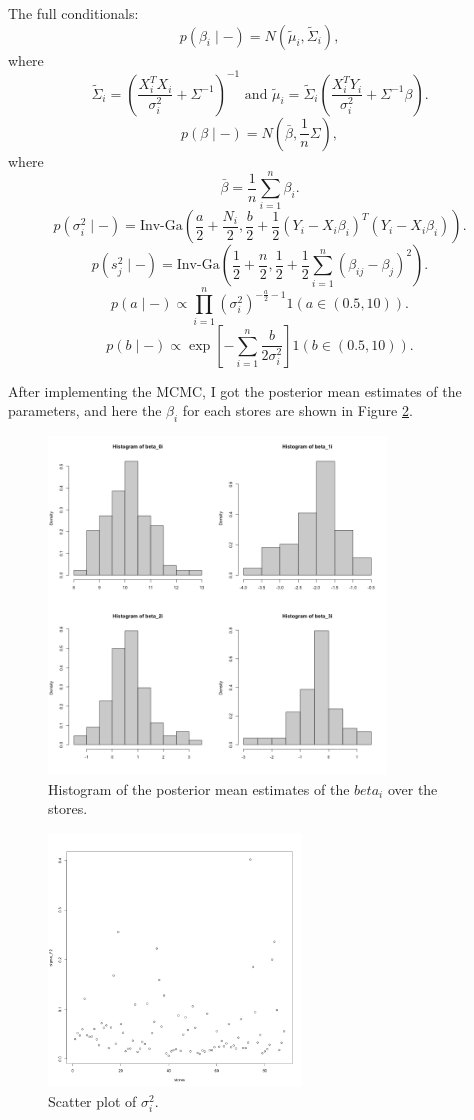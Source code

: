 \documentclass[11pt]{article}
\begin{document}
The full conditionals:
$$p(\beta_i \mid -) = N(\tilde{\mu}_i, \tilde{\Sigma}_i),$$
where $$\tilde{\Sigma}_i = \left( \frac{X_i^TX_i}{\sigma_i^2} + \Sigma^{-1} \right)^{-1} \text{ and } \tilde{\mu}_i = \tilde{\Sigma}_i \left( \frac{X_i^TY_i}{\sigma_i^2} + \Sigma^{-1}\beta \right).$$
$$p(\beta \mid - ) = N(\bar{\beta}, \frac{1}n \Sigma),$$
where $$\bar{\beta} = \frac{1}n \sum_{i=1}^n \beta_i.$$
$$p(\sigma_i^2 \mid -) = \text{Inv-Ga}(\frac{a}2 + \frac{N_i}2, \frac{b}2 + \frac{1}2(Y_i - X_i\beta_i)^T(Y_i - X_i\beta_i)).$$
$$p(s_j^2 \mid -) = \text{Inv-Ga}(\frac{1}2 + \frac{n}2, \frac{1}2 + \frac{1}2\sum_{i=1}^n (\beta_{ij}-\beta_j)^2).$$
$$p(a \mid -) \propto \prod_{i=1}^n (\sigma^2_i)^{-\frac{a}2 -1} 1(a \in (0.5,10)).$$
$$p(b \mid -) \propto \exp[- \sum_{i=1}^n \frac{b}{2\sigma_i^2}] 1(b \in (0.5,10)).$$

After implementing the MCMC, I got the posterior mean estimates of the parameters, and here the $\beta_i$ for each stores are shown in Figure \ref{fig:hist_betai}.
\begin{figure}[h]
    \centering
    \includegraphics[width=0.8\textwidth]{Ex5/figures/hist_betai.png}
    \caption{Histogram of the posterior mean estimates of the $beta_i$ over the stores.}
    \label{fig:hist_betai}
\end{figure}
\begin{figure}[h]
    \centering
    \includegraphics[width=0.6\textwidth]{Ex5/figures/sig.png}
    \caption{Scatter plot of $\sigma_i^2$.}
    \label{fig:hist_betai}
\end{figure}
\end{document}
